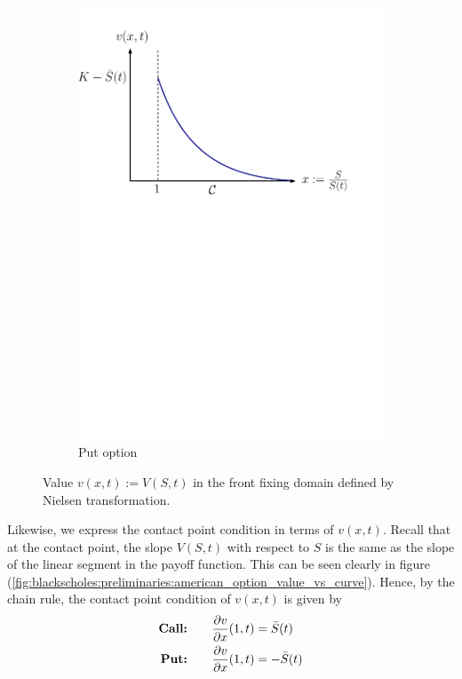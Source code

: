 \begin{figure}[H]
\begin{subfigure}{0.45\textwidth}
    \includegraphics[width=\textwidth]{chapters/chapter2/NielsenPutOption}
    \caption{Put option}
    \label{fig:blackscholes:frontfixingmethod:nielsen_put_value_vs_curve}
  \end{subfigure}
  \caption{Value $v(x,t) := V(S,t)$ in the front fixing domain defined by Nielsen transformation.}
  \label{fig:blackscholes:frontfixingmethod:nielsen_value_vs_curve}
\end{figure}
Likewise, we express the contact point condition in terms of $v(x,t)$. Recall that at the contact point, the slope $V(S,t)$ with respect to $S$ is the same as the slope of the linear segment in the payoff function. This can be seen clearly in figure (\ref{fig:blackscholes:preliminaries:american_option_value_vs_curve}). Hence, by the chain rule, the contact point condition of $v(x,t)$ is given by
\begin{subequations} \label{eq:blackscholes:frontfixingmethod:inversetransform:american_options_optimal_price_contact_point_condition}
  \begin{align}
    \text{\textbf{Call:}} \qquad & \dfrac{\partial v}{\partial x}(1, t) = \bar{S}(t) \\
    \text{\textbf{Put:}} \qquad & \dfrac{\partial v}{\partial x}(1, t) = -\bar{S}(t)
  \end{align}
\end{subequations}
